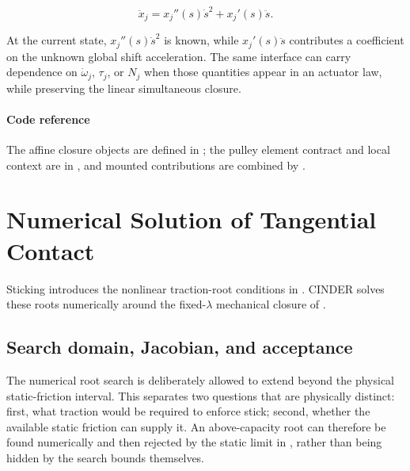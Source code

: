 \documentclass[11pt]{report}
\numberwithin{equation}{section}
\begin{document}
\begin{equation}
    \ddot x_j=x_j''(s)\dot s^2+x_j'(s)\ddot s.
    \label{eq:appendix_affine_local_acceleration}
\end{equation}

At the current state, $x_j''(s)\dot s^2$ is known, while
$x_j'(s)\ddot s$ contributes a coefficient on the unknown global shift
acceleration.  The same interface can carry dependence on
$\dot\omega_j$, $\tau_j$, or $N_j$ when those quantities appear in an actuator
law, while preserving the linear simultaneous closure.

\paragraph{Code reference}
The affine closure objects are defined in
; the pulley
element contract and local context are in
,
and mounted contributions are combined by
.

\section{Numerical Solution of Tangential Contact}
\label{app:num_tangential_contact}

Sticking introduces the nonlinear traction-root conditions in
.
CINDER solves these roots numerically around the fixed-$\lambda$ mechanical
closure of .

\subsection{Search domain, Jacobian, and acceptance}
\label{app:num_contact_search}

The numerical root search is deliberately allowed to extend beyond the
physical static-friction interval.  This separates two questions that are
physically distinct: first, what traction would be required to enforce stick;
second, whether the available static friction can supply it.  An
above-capacity root can therefore be found numerically and then rejected by the
static limit in , rather than
being hidden by the search bounds themselves.
\end{document}
